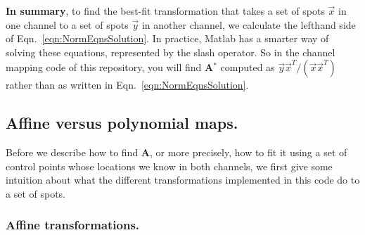 \documentclass[11pt]{article}
\begin{document}
{\bf In summary}, to find the best-fit transformation that takes a set of spots $\vec{x}$ in one channel to a set of spots $\vec{y}$ in another channel, we calculate the lefthand side of Eqn.~\ref{eqn:NormEqnsSolution}. In practice, Matlab has a smarter way of solving these equations, represented by the slash operator. So in the channel mapping code of this repository, you will find {\bf A$^*$} computed as $\vec{y}\vec{x}^T/(\vec{x}\vec{x}^T)$ rather than as written in Eqn.~\ref{eqn:NormEqnsSolution}.

\subsection{Affine versus polynomial maps.}

Before we describe how to find {\bf A}, or more precisely, how to fit it using a set of control points whose locations we know in both channels, we first give some intuition about what the different transformations implemented in this code do to a set of spots.  

\subsubsection{Affine transformations.}
\end{document}
